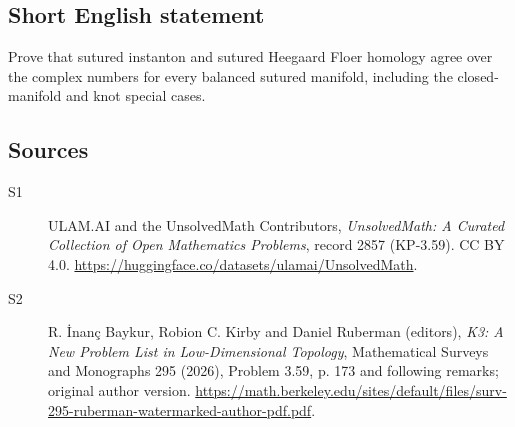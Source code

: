\documentclass[11pt]{article}
\begin{document}
\subsection{Short English statement}
Prove that sutured instanton and sutured Heegaard Floer homology agree over the complex numbers for every balanced sutured manifold, including the closed-manifold and knot special cases.
\subsection{Sources}
\begin{description}
\item[\hypertarget{source:2857:1}{S1}] ULAM.AI and the UnsolvedMath Contributors, \emph{UnsolvedMath: A Curated Collection of Open Mathematics Problems}, record 2857 (KP-3.59). CC BY 4.0. \url{https://huggingface.co/datasets/ulamai/UnsolvedMath}.
\item[\hypertarget{source:2857:2}{S2}] R. İnanç Baykur, Robion C. Kirby and Daniel Ruberman (editors), \emph{K3: A New Problem List in Low-Dimensional Topology}, Mathematical Surveys and Monographs 295 (2026), Problem 3.59, p. 173 and following remarks; original author version. \url{https://math.berkeley.edu/sites/default/files/surv-295-ruberman-watermarked-author-pdf.pdf}.
\end{description}
\label{end:2857}
\end{document}
